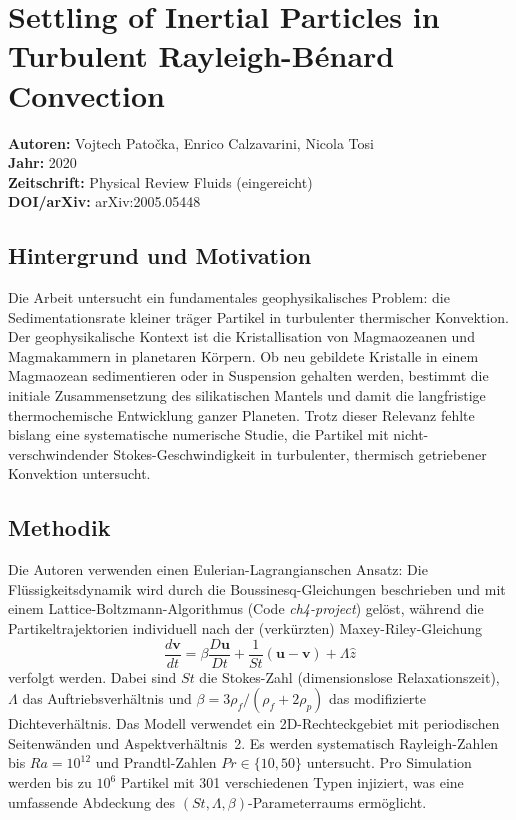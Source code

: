 \documentclass[a4paper,12pt]{article}
\begin{document}
\section*{Settling of Inertial Particles in Turbulent Rayleigh-B\'enard Convection}
\textbf{Autoren:} Vojtech Pato\v{c}ka, Enrico Calzavarini, Nicola Tosi \\
\textbf{Jahr:} 2020 \\
\textbf{Zeitschrift:} Physical Review Fluids (eingereicht) \\
\textbf{DOI/arXiv:} arXiv:2005.05448

\subsection*{Hintergrund und Motivation}

Die Arbeit untersucht ein fundamentales geophysikalisches Problem: die Sedimentationsrate kleiner tr\"ager Partikel in turbulenter thermischer Konvektion. Der geophysikalische Kontext ist die Kristallisation von Magmaozeanen und Magmakammern in planetaren K\"orpern. Ob neu gebildete Kristalle in einem Magmaozean sedimentieren oder in Suspension gehalten werden, bestimmt die initiale Zusammensetzung des silikatischen Mantels und damit die langfristige thermochemische Entwicklung ganzer Planeten. Trotz dieser Relevanz fehlte bislang eine systematische numerische Studie, die Partikel mit nicht-verschwindender Stokes-Geschwindigkeit in turbulenter, thermisch getriebener Konvektion untersucht.

\subsection*{Methodik}

Die Autoren verwenden einen Eulerian-Lagrangianschen Ansatz: Die Fl\"ussigkeitsdynamik wird durch die Boussinesq-Gleichungen beschrieben und mit einem Lattice-Boltzmann-Algorithmus (Code \textit{ch4-project}) gel\"ost, w\"ahrend die Partikeltrajektorien individuell nach der (verk\"urzten) Maxey-Riley-Gleichung
\begin{equation}
    \frac{d\mathbf{v}}{dt} = \beta \frac{D\mathbf{u}}{Dt} + \frac{1}{St}(\mathbf{u} - \mathbf{v}) + \Lambda\hat{z}
\end{equation}
verfolgt werden. Dabei sind $St$ die Stokes-Zahl (dimensionslose Relaxationszeit), $\Lambda$ das Auftriebsverh\"altnis und $\beta = 3\rho_f/(\rho_f + 2\rho_p)$ das modifizierte Dichteverh\"altnis. Das Modell verwendet ein 2D-Rechteckgebiet mit periodischen Seitenwänden und Aspektverhältnis~2. Es werden systematisch Rayleigh-Zahlen bis $Ra = 10^{12}$ und Prandtl-Zahlen $Pr \in \{10, 50\}$ untersucht. Pro Simulation werden bis zu $10^6$ Partikel mit 301 verschiedenen Typen injiziert, was eine umfassende Abdeckung des $(St, \Lambda, \beta)$-Parameterraums erm\"oglicht.
\end{document}
